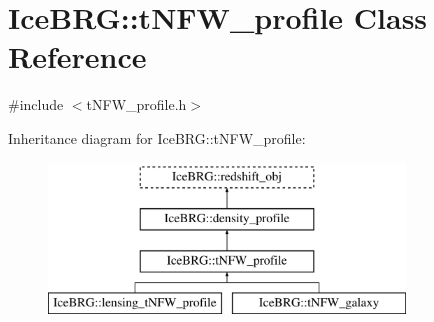 \hypertarget{classIceBRG_1_1tNFW__profile}{}\section{Ice\+B\+R\+G\+:\+:t\+N\+F\+W\+\_\+profile Class Reference}
\label{classIceBRG_1_1tNFW__profile}


{\ttfamily \#include $<$t\+N\+F\+W\+\_\+profile.\+h$>$}

Inheritance diagram for Ice\+B\+R\+G\+:\+:t\+N\+F\+W\+\_\+profile\+:\begin{figure}[H]
\begin{center}
\leavevmode
\includegraphics[height=4.000000cm]{classIceBRG_1_1tNFW__profile}
\end{center}
\end{figure}
